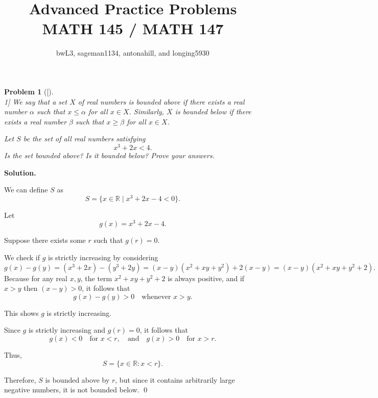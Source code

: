 \documentclass[12pt]{article}
\title{Advanced Practice Problems \\ \large MATH 145 / MATH 147}
\author{bwL3, sageman1134, antonahill, and longing5930}
\date{}
\newtheorem{problemx}{Problem}
\newenvironment{problem}[1]{%
	\begin{problemx}[#1]\leavevmode\\[0.5em] %
	}{%
	\end{problemx}
}
\newenvironment{solution}{%
	\par\medskip
	\noindent\textbf{Solution.}\par\nopagebreak
}{%
	\hfill \qed \par\medskip
}
\begin{document}
	
	\maketitle
	
	\begin{problem}[1]
		We say that a set $X$ of real numbers is \emph{bounded above} if there exists a real number $\alpha$ such that $x \leq \alpha$ for all $x \in X$. Similarly, $X$ is \emph{bounded below} if there exists a real number $\beta$ such that $x \geq \beta$ for all $x \in X$.
		
		\vspace{1em}
		
		Let $S$ be the set of all real numbers satisfying
		\[
		x^3 + 2x < 4.
		\]
		Is the set bounded above? Is it bounded below? Prove your answers.
	\end{problem}
	
	\begin{solution}
		We can define $S$ as
		\[
		S = \{ x \in \mathbb{R} \mid x^3 + 2x - 4 < 0 \}.
		\]
		
		Let 
		\[
		g(x) = x^3 + 2x - 4.
		\]
		
		Suppose there exists some $r$ such that $g(r) = 0$.
		
		We check if $g$ is strictly increasing by considering
		\[
		g(x) - g(y) = (x^3 + 2x) - (y^3 + 2y) = (x - y)(x^2 + xy + y^2) + 2(x - y) = (x - y)(x^2 + xy + y^2 + 2).
		\]
		Because for any real $x, y$, the term $x^2 + xy + y^2 + 2$ is always positive, and if $x > y$ then $(x - y) > 0$, it follows that
		\[
		g(x) - g(y) > 0 \quad \text{whenever } x > y.
		\]
		
		This shows $g$ is strictly increasing.
		
		Since $g$ is strictly increasing and $g(r) = 0$, it follows that
		\[
		g(x) < 0 \quad \text{for } x < r, \quad \text{and} \quad g(x) > 0 \quad \text{for } x > r.
		\]
		
		Thus,
		\[
		S = \{ x \in \mathbb{R} : x < r \}.
		\]
		
		Therefore, $S$ is bounded above by $r$, but since it contains arbitrarily large negative numbers, it is not bounded below.
	\end{solution}
	
\end{document}
